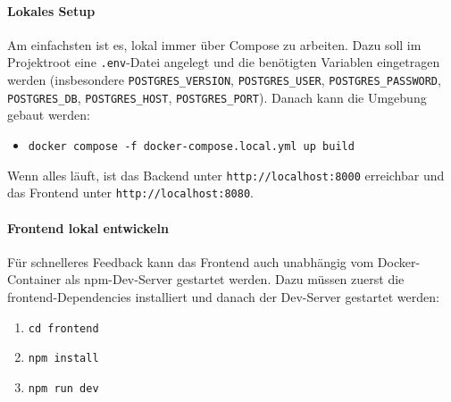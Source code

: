 \documentclass[12pt,a4paper]{article}
\begin{document}
        \paragraph{Lokales Setup}
            Am einfachsten ist es, lokal immer über Compose zu arbeiten. Dazu soll im Projektroot eine \texttt{.env}-Datei angelegt
            und die benötigten Variablen eingetragen werden (insbesondere \texttt{POSTGRES\_VERSION}, \texttt{POSTGRES\_USER},
            \texttt{POSTGRES\_PASSWORD}, \texttt{POSTGRES\_DB}, \texttt{POSTGRES\_HOST}, \texttt{POSTGRES\_PORT}). Danach kann die Umgebung gebaut werden:
            \begin{itemize}[leftmargin=*]
                \item \texttt{docker compose -f docker-compose.local.yml up \textendash\textendash build}
            \end{itemize}
            Wenn alles läuft, ist das Backend unter \texttt{http://localhost:8000} erreichbar und das Frontend
            unter \texttt{http://localhost:8080}.

        \paragraph{Frontend lokal entwickeln}
            Für schnelleres Feedback kann das Frontend auch unabhängig vom Docker-Container als npm-Dev-Server gestartet werden.
            Dazu müssen zuerst die frontend-Dependencies installiert und danach der Dev-Server gestartet werden:
            \begin{enumerate}[leftmargin=*]
                \item \texttt{cd frontend}
                \item \texttt{npm install}
                \item \texttt{npm run dev}
            \end{enumerate}
\end{document}
